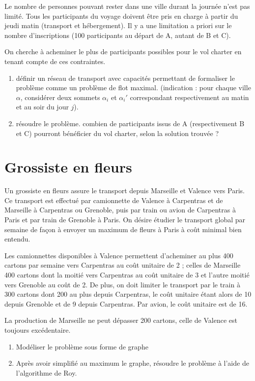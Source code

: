 \documentclass[paper=a4, fontsize=11pt]{scrartcl} %
\numberwithin{equation}{section} %
\numberwithin{figure}{section} %
\numberwithin{table}{section} %
\begin{document}
Le nombre de personnes pouvant rester dans une ville durant la journée
n'est pas limité. Tous les participants du voyage doivent être pris en
charge à partir du jeudi matin (transport et hébergement). Il y a une
limitation a priori sur le nombre d'inscriptions (100 participants au
départ de A, autant de B et C). 

On cherche à acheminer le plus de participants possibles pour le vol
charter en tenant compte de ces contraintes.

\begin{enumerate}
\item définir un réseau de transport avec capacités permettant de
   formaliser le problème comme un problème de flot
   maximal. (indication : pour chaque ville $\alpha$, considérer deux
   sommets $\alpha_i$ et $\alpha_i'$ correspondant respectivement au
   matin et au soir du jour $j$).

\item résoudre le problème. combien de participants issus de A
   (respectivement B et C) pourront bénéficier du vol charter, selon
   la solution trouvée ?
\end{enumerate}

\section{Grossiste en fleurs}

Un grossiste en fleurs assure le transport depuis Marseille et Valence vers Paris. Ce transport est effectué par camionnette de Valence à Carpentras et de Marseille à Carpentras ou Grenoble, puis par train ou avion de Carpentras à Paris et par train de Grenoble à Paris. On désire étudier le transport global par semaine de façon à envoyer un maximum de fleurs à Paris à coût minimal bien entendu.

Les camionnettes disponibles à Valence permettent d'acheminer au plus 400 cartons par semaine vers Carpentras au coût unitaire de 2 ; celles de Marseille 400 cartons dont la moitié vers Carpentras au coût unitaire de 3 et l'autre moitié vers Grenoble au coût de 2. De plus, on doit limiter le transport par le train à 300 cartons dont 200 au plus depuis Carpentras, le coût unitaire étant alors de 10 depuis Grenoble et de 9 depuis Carpentras. Par avion, le coût unitaire est de 16. 

La production de Marseille ne peut dépasser 200 cartons, celle de Valence est toujours excédentaire.

\begin{enumerate}
\item Modéliser le problème sous forme de graphe 
\item Après avoir simplifié au maximum le graphe, résoudre le problème à l'aide de l'algorithme de Roy.

\end{enumerate}
\end{document}
